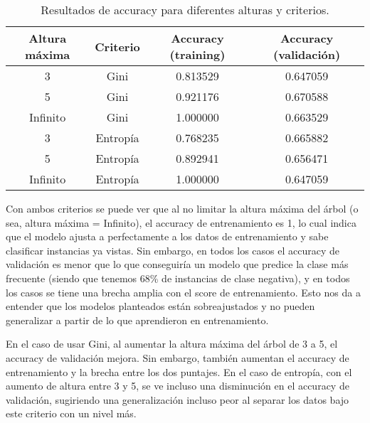 \begin{table}[H]
    \centering
    \begin{tabular}{cccc}
    \hline
    \textbf{Altura máxima} & \textbf{Criterio} & \textbf{Accuracy (training)} & \textbf{Accuracy (validación)} \\ \hline
    3 & Gini     & 0.813529 & 0.647059 \\ \hline
    5 & Gini     & 0.921176 & 0.670588 \\ \hline
    Infinito & Gini     & 1.000000 & 0.663529 \\ \hline
    3 & Entropía & 0.768235 & 0.665882 \\ \hline
    5 & Entropía & 0.892941 & 0.656471 \\ \hline
    Infinito & Entropía & 1.000000 & 0.647059 \\ \hline
    \end{tabular}
    \caption*{Resultados de accuracy para diferentes alturas y criterios.}
    \label{tab:accuracy_arboles}
\end{table}
    
Con ambos criterios se puede ver que al no limitar la altura máxima del árbol (o sea, altura máxima = Infinito),
el accuracy de entrenamiento es 1, lo cual indica que el modelo ajusta a perfectamente a los datos de entrenamiento y sabe clasificar instancias ya vistas. Sin embargo, en todos los casos el accuracy de validación es menor que lo que conseguiría un modelo que predice la clase más frecuente (siendo que tenemos 68\% de instancias de clase negativa), y en todos los casos se tiene una brecha amplia con el score de entrenamiento. Esto nos da a entender que los modelos planteados están sobreajustados y no pueden generalizar a partir de lo que aprendieron en entrenamiento. 

En el caso de usar Gini, al aumentar la altura máxima del árbol de 3 a 5, el accuracy de validación mejora. Sin embargo, también aumentan el accuracy de entrenamiento y la brecha entre los dos puntajes. En el caso de entropía, con el aumento de altura entre 3 y 5, se ve incluso una disminución en el accuracy de validación, sugiriendo una generalización incluso peor al separar los datos bajo este criterio con un nivel más.